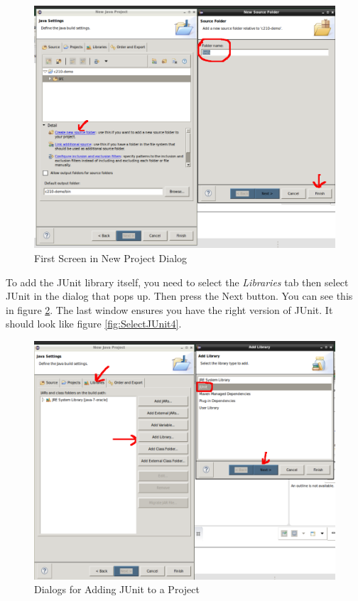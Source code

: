 \documentclass[]{tufte-handout}
\begin{document}
\vspace{.1in}
\begin{center}
\begin{figure}[!htb]
\includegraphics[scale=.3]{Eclipse-AddTestFolder.png}
\caption{First Screen in New Project Dialog}
\label{fig:newsrcfold} 
\end{figure}
\end{center}
\vspace{.1in}

To add the JUnit library itself, you need to select the \textit{Libraries} tab then select JUnit in the dialog that pops up. Then press the Next button. You can see this in figure \ref{fig:AddJUnitLib}. The last window ensures you have the right version of JUnit. It should look like figure \ref{fig:SelectJUnit4}.

\vspace{.1in}
\begin{center}
\begin{figure}[!htb]
\includegraphics[scale=.3]{Eclipse-AddJUnitLib.png}
\caption{Dialogs for Adding JUnit to a Project}
\label{fig:AddJUnitLib} 
\end{figure}
\end{center}
\vspace{.1in}
\end{document}
